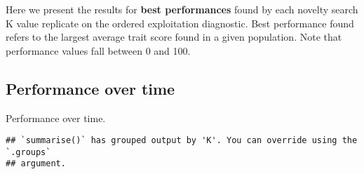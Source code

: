 \documentclass[]{book}
\newenvironment{Shaded}{\begin{snugshade}}{\end{snugshade}}
\newcommand{\DataTypeTok}[1]{\textcolor[rgb]{0.13,0.29,0.53}{#1}}
\newcommand{\KeywordTok}[1]{\textcolor[rgb]{0.13,0.29,0.53}{\textbf{#1}}}
\newcommand{\NormalTok}[1]{#1}
\newcommand{\OperatorTok}[1]{\textcolor[rgb]{0.81,0.36,0.00}{\textbf{#1}}}
\newcommand{\StringTok}[1]{\textcolor[rgb]{0.31,0.60,0.02}{#1}}
\begin{document}
Here we present the results for \textbf{best performances} found by each novelty search K value replicate on the ordered exploitation diagnostic.
Best performance found refers to the largest average trait score found in a given population.
Note that performance values fall between 0 and 100.

\hypertarget{performance-over-time-18}{%
\subsection{Performance over time}\label{performance-over-time-18}}

Performance over time.

\begin{Shaded}
\end{Shaded}

\begin{verbatim}
## `summarise()` has grouped output by 'K'. You can override using the `.groups`
## argument.
\end{verbatim}
\end{document}
